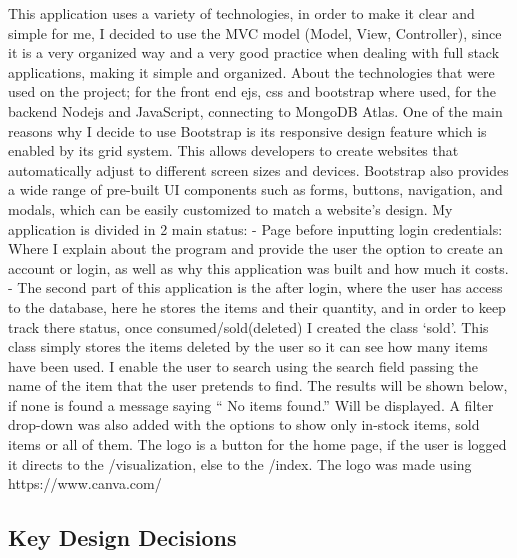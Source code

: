 This application uses a variety of technologies, in order to make it
clear and simple for me, I decided to use the MVC model (Model, View,
Controller), since it is a very organized way and a very good practice
when dealing with full stack applications, making it simple and
organized. About the technologies that were used on the project; for the
front end ejs, css and bootstrap where used, for the backend Nodejs and
JavaScript, connecting to MongoDB Atlas. One of the main reasons why I
decide to use Bootstrap is its responsive design feature which is
enabled by its grid system. This allows developers to create websites
that automatically adjust to different screen sizes and devices.
Bootstrap also provides a wide range of pre-built UI components such as
forms, buttons, navigation, and modals, which can be easily customized
to match a website's design. My application is divided in 2 main status:
- Page before inputting login credentials: Where I explain about the
program and provide the user the option to create an account or login,
as well as why this application was built and how much it costs. - The
second part of this application is the after login, where the user has
access to the database, here he stores the items and their quantity, and
in order to keep track there status, once consumed/sold(deleted) I
created the class `sold'. This class simply stores the items deleted by
the user so it can see how many items have been used. I enable the user
to search using the search field passing the name of the item that the
user pretends to find. The results will be shown below, if none is found
a message saying `` No items found.'' Will be displayed. A filter
drop-down was also added with the options to show only in-stock items,
sold items or all of them. The logo is a button for the home page, if
the user is logged it directs to the /visualization, else to the /index.
The logo was made using https://www.canva.com/

\hypertarget{key-design-decisions}{%
\subsection{Key Design Decisions}\label{key-design-decisions}}

